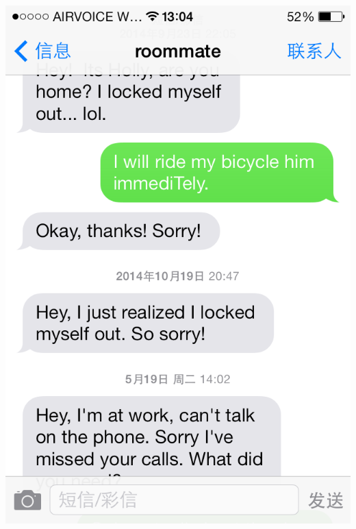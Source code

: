 \documentclass[9pt,b5paper]{article}
\begin{document}
\begin{itemize}
\includegraphics[width=.9\linewidth]{./pic/IMG_0427.PNG}

\end{itemize}
\end{document}
